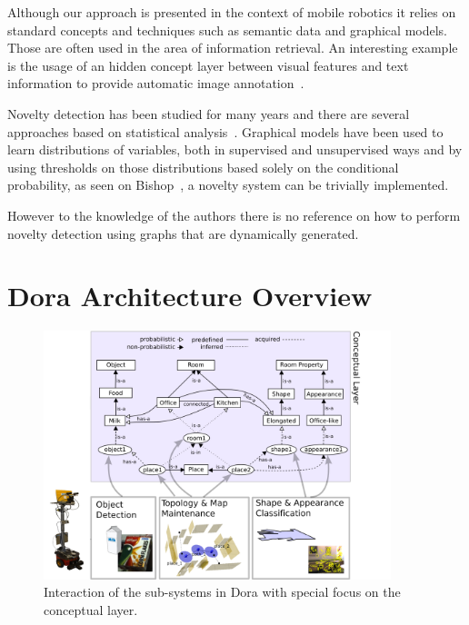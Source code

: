 \documentclass[runningheads,a4paper]{llncs}
\begin{document}
Although our approach is presented in the context of mobile robotics it relies on
standard concepts and techniques such as semantic data and graphical models.
Those are often used in the area of information retrieval.
An interesting example is the usage of an hidden concept layer between visual features
and text information to provide automatic image annotation~\cite{zhang2006probabilistic}.

Novelty detection has been studied for many years and there are several approaches
based on statistical analysis~\cite{markou2003novelty}.
Graphical models have been used to learn distributions of variables, both in
supervised and unsupervised ways and by using thresholds on those distributions
based solely on the conditional probability, as seen on Bishop~\cite{bishop1994novelty},
a novelty system can be trivially implemented.

However to the knowledge of the authors there is no reference on how to perform
novelty detection using graphs that are dynamically generated.

\section{Dora Architecture Overview}
\label{sec:overview}

\begin{figure}[h]
\centering
\includegraphics[width=0.9\textwidth]{figures/processes.pdf}
\caption{\label{fig:conceptual-layer}Interaction of the sub-systems
         in Dora with special focus on the conceptual layer.}
\end{figure}
\end{document}
